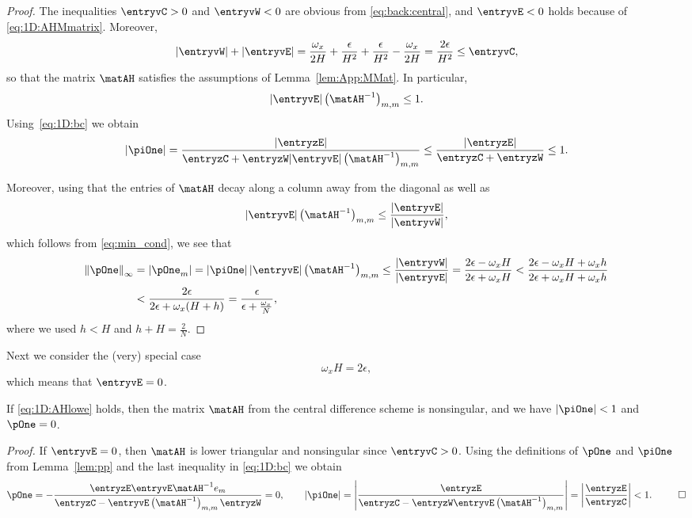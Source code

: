 \begin{proof}
The inequalities $\entryvC>0$ and $\entryvW<0$ are obvious from
\eqref{eq:back:central}, and $\entryvE<0$ holds because of \eqref{eq:1D:AHMmatrix}.
Moreover,
%
$$|\entryvW|+|\entryvE|=\frac{\omega_x}{2H}+\frac{\epsilon}{H^{2}}+
\frac{\epsilon}{H^{2}}-\frac{\omega_x}{2H}=\frac{2\epsilon}{H^{2}}\leq\entryvC,$$
%
so that the matrix $\matAH$ satisfies the assumptions of Lemma~\ref{lem:App:MMat}.
In particular,
%
$$|\entryvE|  \left(\matAH ^{-1}\right)_{m,m}\leq 1.$$
%
Using~\eqref{eq:1D:bc} we obtain
%
$$|\piOne|=\frac{|\entryzE| }{\entryzC +\entryzW |\entryvE|
\left(\matAH ^{-1}\right)_{m,m}}
\leq\frac{|\entryzE| }{\entryzC + \entryzW}\leq 1.$$

Moreover, using that the entries of $\matAH$ decay along a column away from
the diagonal as well as
%
$$|\entryvE|  \left(\matAH ^{-1}\right)_{m,m}\leq
\frac{|\entryvE|}{|\entryvW|},$$
%
which follows from \eqref{eq:min_cond}, we see that
%
\begin{align*}
\left\Vert\pOne\right\Vert_\infty & =\left|\pOne_{m}\right| = |\piOne|\,
|\entryvE|  \left(\matAH ^{-1}\right)_{m,m}\leq
\frac{|\entryvW|}{|\entryvE|} =\frac{2\epsilon-\omega_x H}{2\epsilon+\omega_x H}
<\frac{2\epsilon-\omega_x H+\omega_x h}{2\epsilon+\omega_x H+\omega_x h}\\
 &<\frac{2\epsilon}{2\epsilon+\omega_x(H+h)}=\frac{\epsilon}{\epsilon+\frac{\omega_x}{N}},
\end{align*}
%
where we used $h<H$ and $h+H=\frac{2}{N}$.
\end{proof}

Next we consider the (very) special case
%
\begin{equation}\label{eq:1D:AHlowe}
\omega_x H=2\epsilon,
\end{equation}
%
which means that $\entryvE=0$.

\begin{lemma}\label{lem:p4}
If \eqref{eq:1D:AHlowe} holds, then the matrix $\matAH$ from the central
difference scheme is nonsingular, and we have $|\piOne|<1$ and $\pOne=0$.
\end{lemma}

{\em Proof.}
If $\entryvE=0$, then $\matAH$ is lower triangular and nonsingular since
$\entryvC>0$. Using the definitions of $\pOne$ and $\piOne$ from
Lemma~\ref{lem:pp} and the last inequality in \eqref{eq:1D:bc} we obtain
%
$$\pOne=-\frac{\entryzE\entryvE \matAH^{-1} e_m}{\entryzC-\entryvE\left(\matAH^{-1}\right)_{m,m}\entryzW}=0,\qquad
|\piOne| = \left|\frac{\entryzE}{\entryzC-\entryzW\entryvE\left(\matAH^{-1}\right)_{m,m}}\right| =
\left|\frac{\entryzE}{\entryzC}\right|<1. ~~ \qed$$
%


